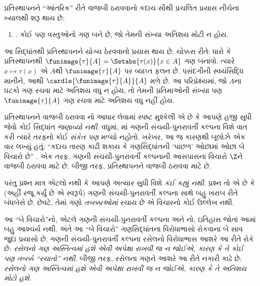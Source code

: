 \begingroup
\makeatletter{}\makeatother

\label{guunit:OLP-0569}


પ્રતિસ્થાપનને ``આંતરિક'' રીતે વાજબી ઠરાવવાનો કદાચ સૌથી
પ્રચલિત પ્રયાસ નીચેના ખ્યાલથી શરૂ થાય છે:
\begin{enumerate}
	\item[] \limofsize. કોઈ પણ વસ્તુઓનો ગણ બને છે,
	જો તેમની સંખ્યા અતિશય મોટી ન હોય.
\end{enumerate}
આ સિદ્ધાંતથી પ્રતિસ્થાપનને યોગ્ય ઠેરવવાનો પ્રયાસ થાય છે.
ચોક્કસ રીતે: ધારો કે પ્રતિસ્થાપનથી
$\funimage{\tau}{A} = \Setabs{\tau(x)}{x \in A}$ ગણ
બનાવો. ત્યારે $x \mapsto \tau(x)$ એ $A$થી
$\funimage{\tau}{A}$ પર વ્યાપ્ત ફલન છે.
પસંદગીની સ્વયંસિદ્ધિ માનીને, આથી
$\cardle{\funimage{\tau}{A}}{A}$ મળે છે. આ પરિપ્રેક્ષ્યમાં,
જો $A$ના ઘટકો ગણ રચવા માટે અતિશય વધુ ન હોય,
તો તેમની પ્રતિમાઓની સંખ્યા પણ $\funimage{\tau}{A}$ ગણ
રચવા માટે અતિશય વધુ નહીં હોય.

પ્રતિસ્થાપનને વાજબી ઠરાવવા \limofsize{}નો આધાર
લેવામાં સ્પષ્ટ મુશ્કેલી એ છે કે આપણે હજી સુધી
\limofsize{} જેવો કોઈ સિદ્ધાંત \emph{જણાવ્યો નથી}.
વધુમાં, માં
ગણની સંચયી-પુનરાવર્તી કલ્પના વિશે વાત કરી ત્યારે
\limofsize{} તરફનો કોઈ \emph{સંકેત પણ} મળ્યો નહોતો.
ખરેખર, આ જ કારણથી બૂલોઝે એક વાર લખ્યું હતું:
``કદાચ તારણ કાઢી શકાય કે ગણસિદ્ધાંતની `પાછળ' ઓછામાં
ઓછા બે વિચારો છે'' \citeyearpar[p.~19]{Boolos1989}.
એક તરફ, ગણની સંચયી-પુનરાવર્તી કલ્પનાની આસપાસના
વિચારો $\Z$ને વાજબી ઠરાવવા માટે છે. બીજી તરફ,
\limofsize{} પ્રતિસ્થાપનને વાજબી ઠરાવવા માટે છે.

પરંતુ પ્રશ્ન માત્ર એટલો નથી કે આપણે અત્યાર સુધી
\limofsize{} વિશે \emph{કંઈ કહ્યું નથી}. પ્રશ્ન તો
એ છે કે \limofsize{} (અહીં રજૂ કર્યું છે એ સ્વરૂપે)
ગણની સંચયી-પુનરાવર્તી કલ્પના સાથે બહુ ખરાબ રીતે
બંધબેસે છે. છેવટે, તેમાં ગણો \emph{તબક્કાઓમાં}
રચાય છે એ વિચારનો કોઈ ઉલ્લેખ નથી.

આ ``બે વિચારો''નો, એટલે ગણની સંચયી-પુનરાવર્તી
કલ્પના અને \limofsize{}નો, ઇતિહાસ જોતાં આમાં
બહુ આશ્ચર્ય નથી. અંતે આ ``બે વિચારો'' ગણસિદ્ધાંતના
વિરોધાભાસો રોકવાના બે સાવ જુદા પ્રયાસો છે.
ગણની સંચયી-પુનરાવર્તી કલ્પના રસેલનો વિરોધાભાસ
આશરે આ રીતે રોકે છે: \emph{રસેલનો ગણ અસ્તિત્વમાં હશે
એવી અપેક્ષા રાખવી જ ન જોઈએ, કારણ કે તે કોઈ પણ
તબક્કે ``રચાતો'' નથી}. બીજી તરફ, \limofsize{}
રસેલના ગણને આશરે આ રીતે નકારી કાઢે છે:
\emph{રસેલનો ગણ અસ્તિત્વમાં હશે એવી અપેક્ષા રાખવી જ
ન જોઈએ, કારણ કે તે અતિશય મોટો હશે}.

